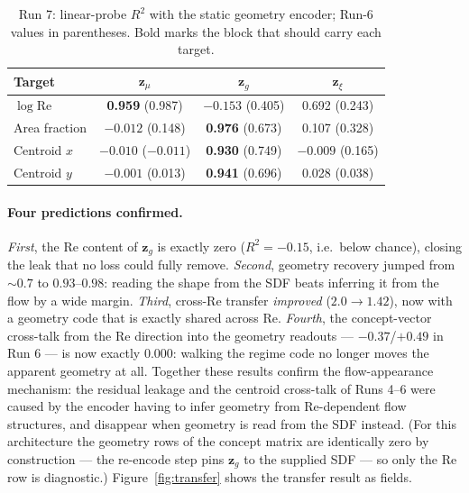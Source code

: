 \documentclass[11pt]{article}
\begin{document}
\begin{table}[htbp]
  \centering
  \caption{Run 7: linear-probe $R^2$ with the static geometry encoder;
  Run-6 values in parentheses. Bold marks the block that should carry
  each target.}
  \label{tab:probes-run7}
  \begin{tabular}{lccc}
    \toprule
    Target & $\boldsymbol{z}_{\mu}$ & $\boldsymbol{z}_{g}$ & $\boldsymbol{z}_{\xi}$ \\
    \midrule
    $\log \mathrm{Re}$ & \textbf{0.959} (0.987) & $-0.153$ (0.405) & 0.692 (0.243) \\
    Area fraction      & $-0.012$ (0.148)       & \textbf{0.976} (0.673) & 0.107 (0.328) \\
    Centroid $x$       & $-0.010$ ($-0.011$)    & \textbf{0.930} (0.749) & $-0.009$ (0.165) \\
    Centroid $y$       & $-0.001$ (0.013)       & \textbf{0.941} (0.696) & 0.028 (0.038) \\
    \bottomrule
  \end{tabular}
\end{table}

\paragraph{Four predictions confirmed.} \emph{First}, the Re content of
$\boldsymbol{z}_{g}$ is exactly zero ($R^2 = -0.15$, i.e.\ below
chance), closing the leak that no loss could fully remove. \emph{Second},
geometry recovery jumped from $\sim 0.7$ to $0.93$--$0.98$: reading the
shape from the SDF beats inferring it from the flow by a wide margin.
\emph{Third}, cross-Re transfer \emph{improved} ($2.0 \to 1.42$), now
with a geometry code that is exactly shared across Re. \emph{Fourth},
the concept-vector cross-talk from the Re direction into the geometry
readouts --- $-0.37$/$+0.49$ in Run 6 --- is now exactly $0.000$:
walking the regime code no longer moves the apparent geometry at all.
Together these results confirm the flow-appearance mechanism: the
residual leakage and the centroid cross-talk of Runs 4--6 were caused by
the encoder having to infer geometry from Re-dependent flow structures,
and disappear when geometry is read from the SDF instead. (For this
architecture the geometry rows of the concept matrix are identically
zero by construction --- the re-encode step pins $\boldsymbol{z}_{g}$ to
the supplied SDF --- so only the Re row is diagnostic.)
Figure~\ref{fig:transfer} shows the transfer result as fields.
\end{document}
